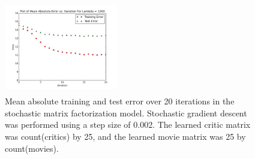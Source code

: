\documentclass[10.5pt]{article}
\newcommand{\factwidth}{0.44}
\newcommand{\factheight}{1.6in}
\begin{document}
\begin{figure}[H]
\includegraphics[width=0\factwidth\textwidth,height=\factheight]{matrix_plots/test-i40d25l1000.png}
\caption{Mean absolute training and test error over 20 iterations in the stochastic matrix factorization model. Stochastic gradient descent was performed using a step size of 0.002. The learned critic matrix was count(critics) by 25, and the learned movie matrix was 25 by count(movies).}
\label{fig:fac-d25}
\end{figure}
\end{document}

